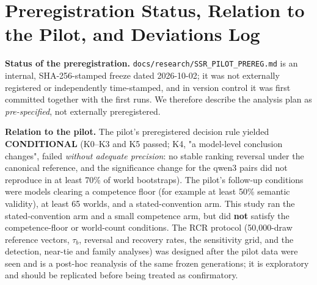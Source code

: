 \documentclass[11pt]{article}
\begin{document}
\section{Preregistration Status, Relation to the Pilot, and Deviations Log}
\textbf{Status of the preregistration.} \texttt{docs/research/SSR\_PILOT\_PREREG.md} is an internal, SHA-256-stamped freeze dated 2026-10-02; it was not externally registered or independently time-stamped, and in version control it was first committed together with the first runs. We therefore describe the analysis plan as \emph{pre-specified}, not externally preregistered.

\textbf{Relation to the pilot.} The pilot's preregistered decision rule yielded \textbf{CONDITIONAL} (K0--K3 and K5 passed; K4, "a model-level conclusion changes", failed \emph{without adequate precision}: no stable ranking reversal under the canonical reference, and the significance change for the qwen3 pairs did not reproduce in at least 70\% of world bootstraps). The pilot's follow-up conditions were models clearing a competence floor (for example at least 50\% semantic validity), at least 65 worlds, and a stated-convention arm. This study ran the stated-convention arm and a small competence arm, but did \textbf{not} satisfy the competence-floor or world-count conditions. The RCR protocol (50,000-draw reference vectors, $\tau_b$, reversal and recovery rates, the sensitivity grid, and the detection, near-tie and family analyses) was designed after the pilot data were seen and is a post-hoc reanalysis of the same frozen generations; it is exploratory and should be replicated before being treated as confirmatory.
\end{document}
